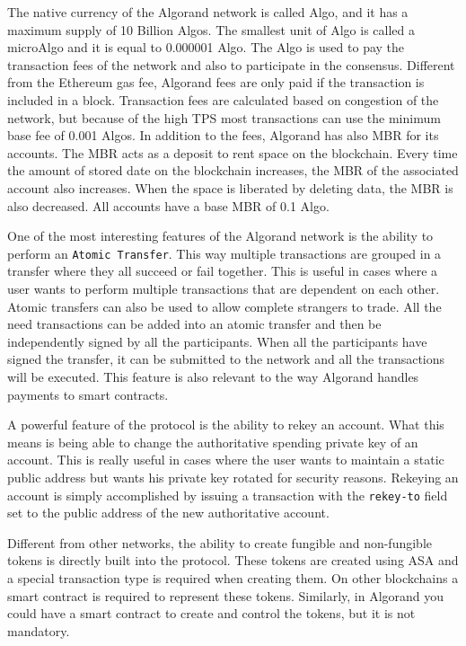 The native currency of the Algorand network is called Algo, and it has a maximum supply of 10 Billion Algos. The smallest unit of Algo is called a microAlgo and it is equal to 0.000001 Algo. The Algo is used to pay the transaction fees of the network and also to participate in the consensus. Different from the Ethereum gas fee, Algorand fees are only paid if the transaction is included in a block. Transaction fees are calculated based on congestion of the network, but because of the high TPS most transactions can use the minimum base fee of 0.001 Algos. In addition to the fees, Algorand has also \ac{MBR} for its accounts. The \ac{MBR} acts as a deposit to rent space on the blockchain. Every time the amount of stored date on the blockchain increases, the \ac{MBR} of the associated account also increases. When the space is liberated by deleting data, the \ac{MBR} is also decreased. All accounts have a base \ac{MBR} of 0.1 Algo.

One of the most interesting features of the Algorand network is the ability to perform an \texttt{Atomic Transfer}. This way multiple transactions are grouped in a transfer where they all succeed or fail together. This is useful in cases where a user wants to perform multiple transactions that are dependent on each other. Atomic transfers can also be used to allow complete strangers to trade. All the need transactions can be added into an atomic transfer and then be independently signed by all the participants. When all the participants have signed the transfer, it can be submitted to the network and all the transactions will be executed. This feature is also relevant to the way Algorand handles payments to smart contracts.

A powerful feature of the protocol is the ability to rekey an account. What this means is being able to change the authoritative spending private key of an account. This is really useful in cases where the user wants to maintain a static public address but wants his private key rotated for security reasons. Rekeying an account is simply accomplished by issuing a transaction with the \texttt{rekey-to} field set to the public address of the new authoritative account.

Different from other networks, the ability to create fungible and non-fungible tokens is directly built into the protocol. These tokens are created using \ac{ASA} and a special transaction type is required when creating them. On other blockchains a smart contract is required to represent these tokens. Similarly, in Algorand you could have a smart contract to create and control the tokens, but it is not mandatory.

